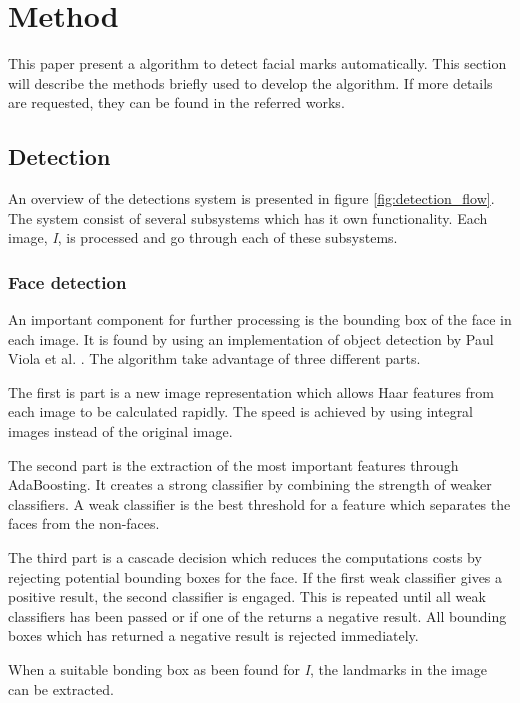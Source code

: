 \chapter{Method}\label{cha:method}

This paper present a algorithm to detect facial marks automatically. This section will describe the methods briefly used to develop the algorithm. If more details are requested, they can be found in the referred works. 

\section{Detection}

An overview of the detections system is presented in figure \ref{fig:detection_flow}. The system consist of several subsystems which has it own functionality. Each image, \textit{I}, is processed and go through each of these subsystems. 

\subsection{Face detection}

An important component for further processing is the bounding box of the face in each image. It is found by using an implementation of object detection by Paul Viola et al. \cite{face_detection}. The algorithm take advantage of three different parts. 

The first is part is a new image representation which allows Haar features from each image to be calculated rapidly. The speed is achieved by using integral images instead of the original image. 

The second part is the extraction of the most important features through AdaBoosting. It creates a strong classifier by combining the strength of weaker classifiers. A weak classifier is the best threshold for a feature which separates the faces from the non-faces.

The third part is a cascade decision which reduces the computations costs by rejecting potential bounding boxes for the face. If the first weak classifier gives a positive result, the second classifier is engaged. This is repeated until all weak classifiers has been passed or if one of the returns a negative result. All bounding boxes which has returned a negative result is rejected immediately.  

When a suitable bonding box as been found for \textit{I}, the landmarks in the image can be extracted. 

